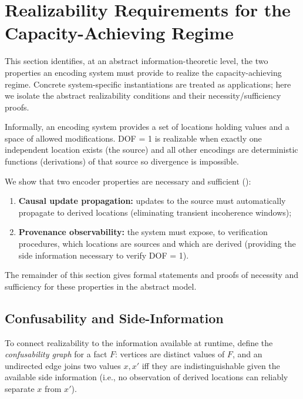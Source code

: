 \section{Realizability Requirements for the Capacity-Achieving Regime}\label{sec:requirements}

This section identifies, at an abstract information-theoretic level, the two properties an encoding system must provide to realize the capacity-achieving regime. Concrete system-specific instantiations are treated as applications; here we isolate the abstract realizability conditions and their necessity/sufficiency proofs.

Informally, an encoding system provides a set of locations holding values and a space of allowed modifications. DOF = 1 is realizable when exactly one independent location exists (the source) and all other encodings are deterministic functions (derivations) of that source so divergence is impossible.

We show that two encoder properties are necessary and sufficient ():
\begin{enumerate}
\item \textbf{Causal update propagation:} updates to the source must automatically propagate to derived locations (eliminating transient incoherence windows);
\item \textbf{Provenance observability:} the system must expose, to verification procedures, which locations are sources and which are derived (providing the side information necessary to verify DOF = 1).
\end{enumerate}

The remainder of this section gives formal statements and proofs of necessity and sufficiency for these properties in the abstract model.

\subsection{Confusability and Side-Information}
\label{sec:confusability}

To connect realizability to the information available at runtime, define the \emph{confusability graph} for a fact $F$: vertices are distinct values of $F$, and an undirected edge joins two values $x,x'$ iff they are indistinguishable given the available side information (i.e., no observation of derived locations can reliably separate $x$ from $x'$).

